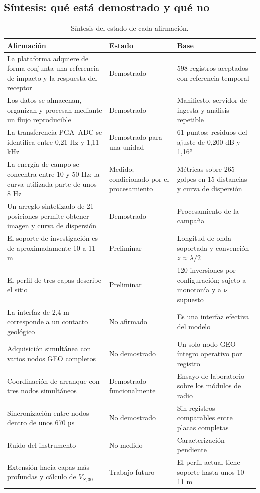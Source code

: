 \begin{table}[!ht]
\subsection{Síntesis: qué está demostrado y qué no}
\label{sec:sintesis}

\centering
\footnotesize
\caption{Síntesis del estado de cada afirmación. }
\begin{tabularx}{0.92\textwidth}{YYY}
\toprule
Afirmación & Estado & Base \\
\midrule
La plataforma adquiere de forma conjunta una referencia de impacto y la respuesta del receptor & Demostrado & 598 registros aceptados con referencia temporal \\
Los datos se almacenan, organizan y procesan mediante un flujo reproducible & Demostrado & Manifiesto, servidor de ingesta y análisis repetible \\
La transferencia PGA--ADC se identifica entre 0,21 Hz y 1,11 kHz & Demostrado para una unidad & 61 puntos; residuos del ajuste de 0,200 dB y 1,16° \\
La energía de campo se concentra entre 10 y 50 Hz; la curva utilizada parte de unos 8 Hz & Medido; condicionado por el procesamiento & Métricas sobre 265 golpes en 15 distancias y curva de dispersión \\
Un arreglo sintetizado de 21 posiciones permite obtener imagen y curva de dispersión & Demostrado & Procesamiento de la campaña \\
El soporte de investigación es de aproximadamente 10 a 11 m & Preliminar & Longitud de onda soportada y convención $z\approx\lambda/2$ \\
El perfil de tres capas describe el sitio & Preliminar & 120 inversiones por configuración; sujeto a monotonía y a $\nu$ supuesto \\
La interfaz de 2,4 m corresponde a un contacto geológico & No afirmado & Es una interfaz efectiva del modelo \\
Adquisición simultánea con varios nodos GEO completos & No demostrado & Un solo nodo GEO íntegro operativo por registro \\
Coordinación de arranque con tres nodos simultáneos & Demostrado funcionalmente & Ensayo de laboratorio sobre los módulos de radio \\
Sincronización entre nodos dentro de unos 670 µs & No demostrado & Sin registros comparables entre placas completas \\
Ruido del instrumento & No medido & Caracterización pendiente \\
Extensión hacia capas más profundas y cálculo de $V_{S,30}$ & Trabajo futuro & El perfil actual tiene soporte hasta unos 10--11 m \\
\bottomrule
\end{tabularx}
\end{table}

